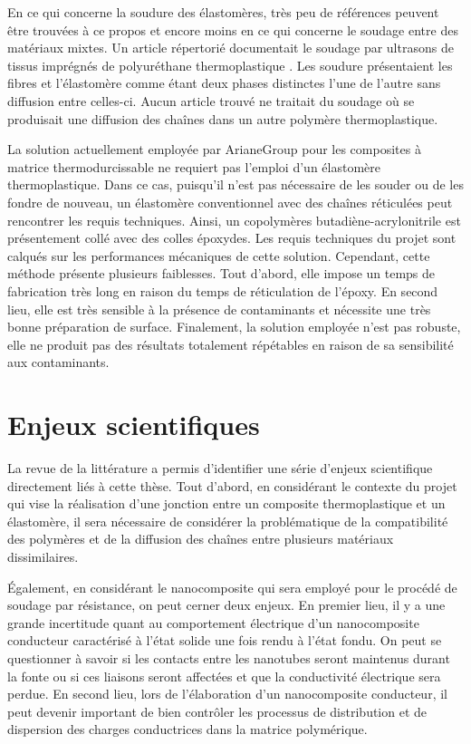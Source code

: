 \FloatBarrier
En ce qui concerne la soudure des élastomères, très peu de références peuvent être trouvées à ce propos et encore moins en ce qui concerne le soudage entre des matériaux mixtes. 
Un article répertorié documentait le soudage par ultrasons de tissus imprégnés de polyuréthane thermoplastique \cite{Hollande1998}. 
Les soudure présentaient les fibres et l'élastomère comme étant deux phases distinctes l'une de l'autre sans diffusion entre celles-ci. 
Aucun article trouvé ne traitait du soudage où se produisait une diffusion des chaînes dans un autre polymère thermoplastique. 

La solution actuellement employée par ArianeGroup pour les composites à matrice thermodurcissable ne requiert pas l'emploi d'un élastomère thermoplastique. 
Dans ce cas, puisqu'il n'est pas nécessaire de les souder ou de les fondre de nouveau, un élastomère conventionnel avec des chaînes réticulées peut rencontrer les requis techniques. 
Ainsi, un copolymères butadiène-acrylonitrile est présentement collé avec des colles époxydes. 
Les requis techniques du projet sont calqués sur les performances mécaniques de cette solution. 
Cependant, cette méthode présente plusieurs faiblesses. 
Tout d'abord, elle impose un temps de fabrication très long en raison du temps de réticulation de l'époxy. 
En second lieu, elle est très sensible à la présence de contaminants et nécessite une très bonne préparation de surface. 
Finalement, la solution employée n'est pas robuste, elle ne produit pas des résultats totalement répétables en raison de sa sensibilité aux contaminants. 

\section{Enjeux scientifiques}

La revue de la littérature a permis d'identifier une série d'enjeux scientifique directement liés à cette thèse. 
Tout d'abord, en considérant le contexte du projet qui vise la réalisation d'une jonction entre un composite thermoplastique et un élastomère, il sera nécessaire de considérer la problématique de la compatibilité des polymères et de la diffusion des chaînes entre plusieurs matériaux dissimilaires. 

Également, en considérant le nanocomposite qui sera employé pour le procédé de soudage par résistance, on peut cerner deux enjeux. 
En premier lieu, il y a une grande incertitude quant au comportement électrique d'un nanocomposite conducteur caractérisé à l'état solide une fois rendu à l'état fondu. 
On peut se questionner à savoir si les contacts entre les nanotubes seront maintenus durant la fonte ou si ces liaisons seront affectées et que la conductivité électrique sera perdue. 
En second lieu, lors de l'élaboration d'un nanocomposite conducteur, il peut devenir important de bien contrôler les processus de distribution et de dispersion des charges conductrices dans la matrice polymérique. 




